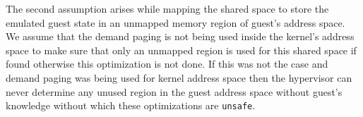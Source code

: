 The second assumption arises while mapping the shared space to store the emulated guest state in an unmapped memory region of guest's address space. We assume that the demand paging is not being used inside the kernel's address space to make sure that only an unmapped region is used for this shared space if found otherwise this optimization is not done. If this was not the case and demand paging was being used for kernel address space then the hypervisor can never determine any unused region in the guest address space without guest's knowledge without which these optimizations are {\tt unsafe}.



